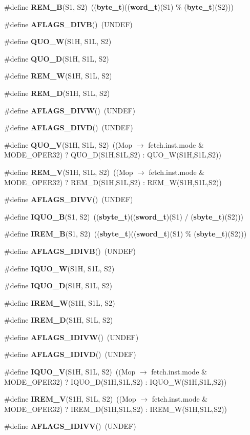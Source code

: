 \begin{CompactItemize}
\item 
\#define {\bf REM\_\-B}(S1, S2)~(({\bf byte\_\-t})(({\bf word\_\-t})(S1) \% ({\bf byte\_\-t})(S2)))
\item 
\#define {\bf AFLAGS\_\-DIVB}()~(UNDEF)
\item 
\#define {\bf QUO\_\-W}(S1H, S1L, S2)
\item 
\#define {\bf QUO\_\-D}(S1H, S1L, S2)
\item 
\#define {\bf REM\_\-W}(S1H, S1L, S2)
\item 
\#define {\bf REM\_\-D}(S1H, S1L, S2)
\item 
\#define {\bf AFLAGS\_\-DIVW}()~(UNDEF)
\item 
\#define {\bf AFLAGS\_\-DIVD}()~(UNDEF)
\item 
\#define {\bf QUO\_\-V}(S1H, S1L, S2)~((Mop $\rightarrow$ fetch.inst.mode \& MODE\_\-OPER32) ? QUO\_\-D(S1H,S1L,S2) : QUO\_\-W(S1H,S1L,S2))
\item 
\#define {\bf REM\_\-V}(S1H, S1L, S2)~((Mop $\rightarrow$ fetch.inst.mode \& MODE\_\-OPER32) ? REM\_\-D(S1H,S1L,S2) : REM\_\-W(S1H,S1L,S2))
\item 
\#define {\bf AFLAGS\_\-DIVV}()~(UNDEF)
\item 
\#define {\bf IQUO\_\-B}(S1, S2)~(({\bf sbyte\_\-t})(({\bf sword\_\-t})(S1) / ({\bf sbyte\_\-t})(S2)))
\item 
\#define {\bf IREM\_\-B}(S1, S2)~(({\bf sbyte\_\-t})(({\bf sword\_\-t})(S1) \% ({\bf sbyte\_\-t})(S2)))
\item 
\#define {\bf AFLAGS\_\-IDIVB}()~(UNDEF)
\item 
\#define {\bf IQUO\_\-W}(S1H, S1L, S2)
\item 
\#define {\bf IQUO\_\-D}(S1H, S1L, S2)
\item 
\#define {\bf IREM\_\-W}(S1H, S1L, S2)
\item 
\#define {\bf IREM\_\-D}(S1H, S1L, S2)
\item 
\#define {\bf AFLAGS\_\-IDIVW}()~(UNDEF)
\item 
\#define {\bf AFLAGS\_\-IDIVD}()~(UNDEF)
\item 
\#define {\bf IQUO\_\-V}(S1H, S1L, S2)~((Mop $\rightarrow$ fetch.inst.mode \& MODE\_\-OPER32) ? IQUO\_\-D(S1H,S1L,S2) : IQUO\_\-W(S1H,S1L,S2))
\item 
\#define {\bf IREM\_\-V}(S1H, S1L, S2)~((Mop $\rightarrow$ fetch.inst.mode \& MODE\_\-OPER32) ? IREM\_\-D(S1H,S1L,S2) : IREM\_\-W(S1H,S1L,S2))
\item 
\#define {\bf AFLAGS\_\-IDIVV}()~(UNDEF)
\item 

\end{CompactItemize}
